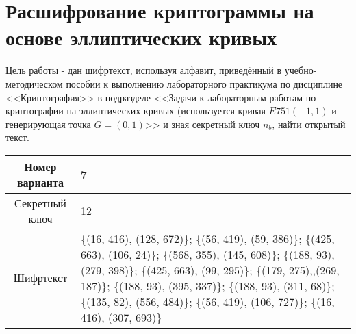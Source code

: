\section{Расшифрование криптограммы на основе эллиптических кривых}

Цель работы - дан шифртекст, используя алфавит, приведённый в учебно-методическом пособии к выполнению лабораторного практикума по дисциплине <<Криптография>> в подразделе <<Задачи к лабораторным работам по криптографии на эллиптических кривых (используется кривая $E751(-1,1)$ и генерирующая точка $G = (0,1)$>> и зная секретный ключ $n_b$, найти открытый текст.

\begin{table}[H]
	\centering
	\begin{tabular}{|c|p{10cm}|}
		\hline
		Номер варианта & 7                                                                                                                                                                                                                                                                                                                                \\ \hline
		Секретный ключ & 12                                                                                                                                                                                                                                                                                                                               \\ \hline
		Шифртекст      & \{(16, 416), (128, 672)\}; \{(56, 419), (59, 386)\}; \{(425, 663), (106, 24)\}; \{(568, 355), (145, 608)\}; \{(188, 93), (279, 398)\}; \{(425, 663), (99, 295)\}; \{(179, 275),,(269, 187)\}; \{(188, 93), (395, 337)\}; \{(188, 93), (311, 68)\}; \{(135, 82), (556, 484)\}; \{(56, 419), (106, 727)\}; \{(16, 416), (307, 693)\} \\ \hline
	\end{tabular}
\end{table}

